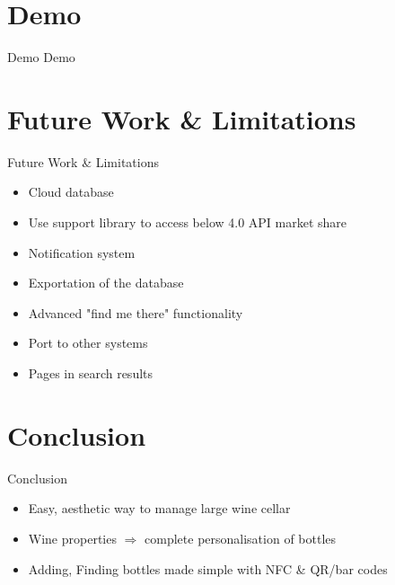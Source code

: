 \documentclass[11pt]{beamer}
\begin{document}


\section{Demo}

\begin{frame}{Demo}
	\center \Huge{Demo}
\end{frame}
\section{Future Work \& Limitations}

\begin{frame}{Future Work \& Limitations}
\begin{itemize}
	\item Cloud database
	\item Use support library to access below 4.0 API market share
	\item Notification system
	\item Exportation of the database
	\item Advanced "find me there" functionality
	\item Port to other systems
	\item Pages in search results
\end{itemize}
\end{frame}

\section{Conclusion}

\begin{frame}{Conclusion}
\begin{itemize}
	\item Easy, aesthetic way to manage large wine cellar
	\item Wine properties $\Rightarrow$ complete personalisation of bottles
	\item Adding, Finding bottles made simple with NFC \& QR/bar codes
\end{itemize}
\end{frame}
\end{document}
